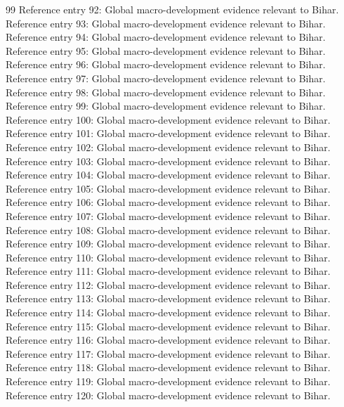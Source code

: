 \documentclass[preprint,12pt]{elsarticle}
\begin{document}
\begin{thebibliography}{99}
\bibitem{} Reference entry 92: Global macro-development evidence relevant to Bihar.
\bibitem{} Reference entry 93: Global macro-development evidence relevant to Bihar.
\bibitem{} Reference entry 94: Global macro-development evidence relevant to Bihar.
\bibitem{} Reference entry 95: Global macro-development evidence relevant to Bihar.
\bibitem{} Reference entry 96: Global macro-development evidence relevant to Bihar.
\bibitem{} Reference entry 97: Global macro-development evidence relevant to Bihar.
\bibitem{} Reference entry 98: Global macro-development evidence relevant to Bihar.
\bibitem{} Reference entry 99: Global macro-development evidence relevant to Bihar.
\bibitem{} Reference entry 100: Global macro-development evidence relevant to Bihar.
\bibitem{} Reference entry 101: Global macro-development evidence relevant to Bihar.
\bibitem{} Reference entry 102: Global macro-development evidence relevant to Bihar.
\bibitem{} Reference entry 103: Global macro-development evidence relevant to Bihar.
\bibitem{} Reference entry 104: Global macro-development evidence relevant to Bihar.
\bibitem{} Reference entry 105: Global macro-development evidence relevant to Bihar.
\bibitem{} Reference entry 106: Global macro-development evidence relevant to Bihar.
\bibitem{} Reference entry 107: Global macro-development evidence relevant to Bihar.
\bibitem{} Reference entry 108: Global macro-development evidence relevant to Bihar.
\bibitem{} Reference entry 109: Global macro-development evidence relevant to Bihar.
\bibitem{} Reference entry 110: Global macro-development evidence relevant to Bihar.
\bibitem{} Reference entry 111: Global macro-development evidence relevant to Bihar.
\bibitem{} Reference entry 112: Global macro-development evidence relevant to Bihar.
\bibitem{} Reference entry 113: Global macro-development evidence relevant to Bihar.
\bibitem{} Reference entry 114: Global macro-development evidence relevant to Bihar.
\bibitem{} Reference entry 115: Global macro-development evidence relevant to Bihar.
\bibitem{} Reference entry 116: Global macro-development evidence relevant to Bihar.
\bibitem{} Reference entry 117: Global macro-development evidence relevant to Bihar.
\bibitem{} Reference entry 118: Global macro-development evidence relevant to Bihar.
\bibitem{} Reference entry 119: Global macro-development evidence relevant to Bihar.
\bibitem{} Reference entry 120: Global macro-development evidence relevant to Bihar.
\end{thebibliography}
\appendix
\end{document}
